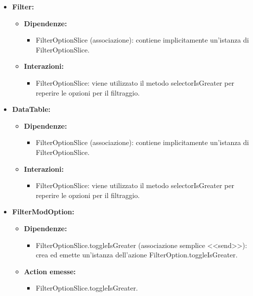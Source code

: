 \begin{itemize}
    \item \textbf{Filter:}
    \begin{itemize}
        \item \textbf{Dipendenze:}
        \begin{itemize}
            \item FilterOptionSlice (associazione): contiene implicitamente un'istanza di FilterOptionSlice.
        \end{itemize} 
        \item \textbf{Interazioni:}
        \begin{itemize}
            \item FilterOptionSlice: viene utilizzato il metodo selectorIsGreater per reperire le opzioni per il filtraggio.
        \end{itemize} 
    \end{itemize}

    \item \textbf{DataTable:}
    \begin{itemize}
        \item \textbf{Dipendenze:}
        \begin{itemize}
            \item FilterOptionSlice (associazione): contiene implicitamente un'istanza di FilterOptionSlice.
        \end{itemize} 
        \item \textbf{Interazioni:}
        \begin{itemize}
            \item FilterOptionSlice: viene utilizzato il metodo selectorIsGreater per reperire le opzioni per il filtraggio.
        \end{itemize} 
    \end{itemize}

    \item \textbf{FilterModOption:}
    \begin{itemize}
        \item \textbf{Dipendenze:}
        \begin{itemize}
            \item FilterOptionSlice.toggleIsGreater (associazione semplice <<send>>): crea ed emette un’istanza dell’azione FilterOption.toggleIsGreater.
        \end{itemize}
        \item \textbf{Action emesse:}
        \begin{itemize}
            \item FilterOptionSlice.toggleIsGreater.
        \end{itemize}  
    \end{itemize}
\end{itemize}

